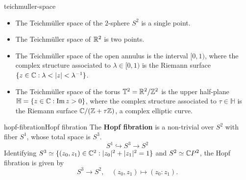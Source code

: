 \begin{example}{teichmuller-space}
    \begin{itemize}
        \item The Teichmüller space of the $2$-sphere $S^2$ is a single point.
        \item The Teichmüller space of $\mathbb{R}^2$ is two points.
        \item The Teichmüller space of the open annulus is the interval $[0, 1)$, where the complex structure associated to $\lambda \in [0, 1)$ is the Riemann surface $\{ z \in \mathbb{C} : \lambda < |z| < \lambda^{-1} \}$.
        \item The Teichmüller space of the torus $\mathbb{T}^2 = \mathbb{R}^2/\mathbb{Z}^2$ is the upper half-plane $\mathbb{H} = \{ z \in \mathbb{C} : \operatorname{Im} z > 0 \}$, where the complex structure associated to $\tau \in \mathbb{H}$ is the Riemann surface $\mathbb{C} / (\mathbb{Z} + \tau \mathbb{Z})$, a complex elliptic curve.
    \end{itemize}
\end{example}

\begin{topic}{hopf-fibration}{Hopf fibration}
    The \textbf{Hopf fibration} is a non-trivial  over $S^2$ with fiber $S^1$, whose total space is $S^3$.
    \[ S^1 \hookrightarrow S^3 \to S^2 \]
    Identifying $S^3 \simeq \{ (z_0, z_1) \in \mathbb{C}^2 : |z_0|^2 + |z_1|^2 = 1 \}$ and $S^2 \simeq \mathbb{C} P^2$, the Hopf fibration is given by
    \[ S^3 \to S^2, \quad (z_0, z_1) \mapsto (z_0 : z_1) . \]
\end{topic}
